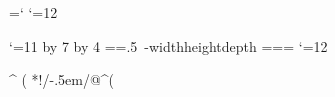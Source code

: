 

\def\dated#1{\def\thedate{#1}}%
\dated{2015-09-26}%
\newcount\atcode \atcode=\catcode`\@%
\catcode`\@=12%

\catcode`\@=11
 \newdimen\xydashw@@
 \xydashw@@\xydashw@
 \multiply\xydashw@@ by 7
 \divide\xydashw@@ by 4
\setbox\zerodotbox@=\hbox{\dimen@=.5\xydashw@@
 \kern-\dimen@ \vrule width\xydashw@@ height\dimen@ depth\dimen@}
\wd\zerodotbox@=\z@ \ht\zerodotbox@=\z@ \dp\zerodotbox@=\z@
\catcode`\@=12

\newdir{ >>}{{}*!/-2.6667\jot/\dir{>>}}
%
\newdir^{ (}{{ }*!/-.5em/@^{(}}%
%
%
%

\newdimen\high%
\newdimen\ul%
\newcount\deltax%
\newcount\deltay%
\newcount\deltaX%
\newcount\deltaXprime%
\newcount\deltaY%
\newcount\deltaYprime%

\newdimen\wdth%
\newcount\xend%
\newcount\yend%
\newcount\Xend%
\newcount\Yend%
\newcount\xpos%
\newcount\ypos%
\newcount{} {}%
\newcount{} {}%
\newcount\topw%
\newcount\botw%
\newcount\Xpos%
\newcount\Ypos%
\def\ratchet#1#2{\ifnum#1<#2\global #1=#2\fi}%

